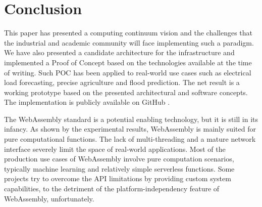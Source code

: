 


\section{Conclusion}
\label{sec:conclusion}

This paper has presented a computing continuum vision and the challenges that the industrial and academic community will face implementing such a paradigm. We have also presented a candidate architecture for the infrastructure and implemented a Proof of Concept based on the technologies available at the time of writing. Such POC has been applied to real-world use cases such as electrical load forecasting, precise agriculture and flood prediction. The net result is a working prototype based on the presented architectural and software concepts. The implementation is publicly available on GitHub \cite{fedra-thesis}. 

The WebAssembly standard is a potential enabling technology, but it is still in its infancy. As shown by the experimental results, WebAssembly is mainly suited for pure computational functions. The lack of multi-threading and a mature network interface severely limit the space of real-world applications. Most of the production use cases of WebAssembly involve pure computation scenarios, typically machine learning and relatively simple serverless functions. Some projects try to overcome the API limitations by providing custom system capabilities, to the detriment of the platform-independency feature of WebAssembly, unfortunately.
